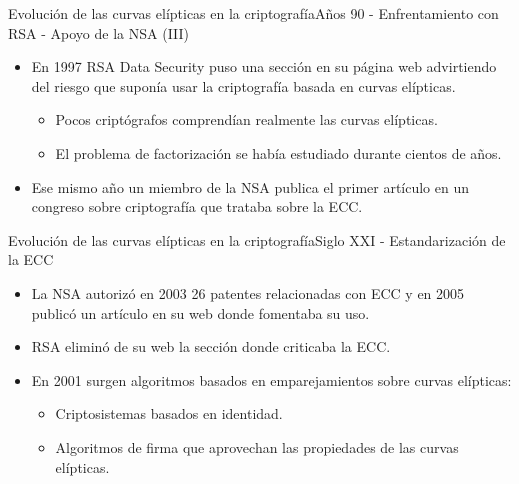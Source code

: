\documentclass[spanish]{beamer}
\begin{document}
\begin{frame}[fragile]{Evolución de las curvas elípticas en la criptografía}{Años 90 - Enfrentamiento con RSA - Apoyo de la NSA (III)}
    \begin{itemize}
    \item En 1997 RSA Data Security puso una sección en su página web advirtiendo del riesgo que suponía usar la criptografía basada en curvas elípticas.
    \begin{itemize}
        \item Pocos criptógrafos comprendían realmente las curvas elípticas.
	    \item El problema de factorización se había estudiado durante cientos de años.
\end{itemize}
    \item Ese mismo año un miembro de la NSA publica
    el primer artículo en un congreso sobre criptografía que trataba sobre la ECC.
  \end{itemize}
\end{frame}

 \begin{frame}[fragile]{Evolución de las curvas elípticas en la criptografía}{Siglo XXI - Estandarización de la ECC}
    \begin{itemize}
    \item La NSA autorizó en 2003 26 patentes relacionadas
con ECC y en 2005 publicó un artículo en su web donde fomentaba su uso.
    \item RSA eliminó de su web la sección donde criticaba la ECC.
    \item En 2001 surgen algoritmos basados en emparejamientos sobre curvas elípticas: %
    \begin{itemize}
	    \item Criptosistemas basados en identidad.
	    \item Algoritmos de firma que aprovechan las propiedades de las curvas elípticas.    
    \end{itemize}
  \end{itemize}
\end{frame}
\end{document}
